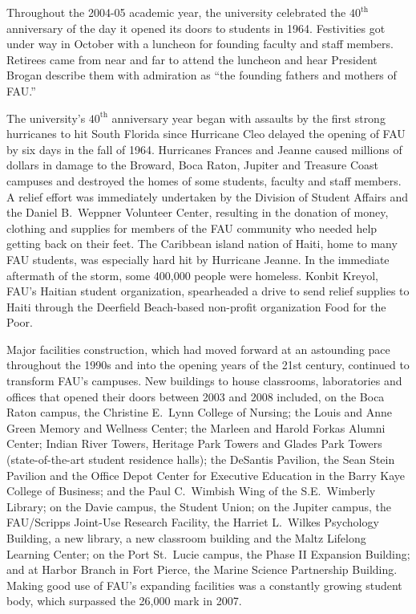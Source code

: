 \documentclass{article}
\begin{document}
Throughout the 2004-05 academic year, the university celebrated the $40^{\mathrm{th}}$ anniversary of the day it opened its doors to students in 1964.  Festivities got under way in October with a luncheon for founding faculty and staff members.  Retirees came from near and far to attend the luncheon and hear President Brogan describe them with admiration as ``the founding fathers and mothers of FAU.''

The university's $40^{\mathrm{th}}$ anniversary year began with assaults by the first strong hurricanes to hit South Florida since Hurricane Cleo delayed the opening of FAU by six days in the fall of 1964.  Hurricanes Frances and Jeanne caused millions of dollars in damage to the Broward, Boca Raton, Jupiter and Treasure Coast campuses and destroyed the homes of some students, faculty and staff members.  A relief effort was immediately undertaken by the Division of Student Affairs and the Daniel B.\ Weppner Volunteer Center, resulting in the donation of money, clothing and supplies for members of the FAU community who needed help getting back on their feet.  The Caribbean island nation of Haiti, home to many FAU students, was especially hard hit by Hurricane Jeanne.  In the immediate aftermath of the storm, some 400,000 people were homeless.  Konbit Kreyol, FAU's Haitian student organization, spearheaded a drive to send relief supplies to Haiti through the Deerfield Beach-based non-profit organization Food for the Poor.

Major facilities construction, which had moved forward at an astounding pace throughout the 1990s and into the opening years of the 21st century, continued to transform FAU's campuses.  New buildings to house classrooms, laboratories and offices that opened their doors between 2003 and 2008 included, on the Boca Raton campus, the Christine E.\ Lynn College of Nursing; the Louis and Anne Green Memory and Wellness Center; the Marleen and Harold Forkas Alumni Center; Indian River Towers, Heritage Park Towers and Glades Park Towers (state-of-the-art student residence halls); the DeSantis Pavilion, the Sean Stein Pavilion and the Office Depot Center for Executive Education in the Barry Kaye College of Business; and the Paul C.\ Wimbish Wing of the S.E.\ Wimberly Library; on the Davie campus, the Student Union; on the Jupiter campus, the FAU/Scripps Joint-Use Research Facility, the Harriet L.\ Wilkes Psychology Building, a new library, a new classroom building and the Maltz Lifelong Learning Center; on the Port St.\ Lucie campus, the Phase II Expansion Building; and at Harbor Branch in Fort Pierce, the Marine Science Partnership Building.  Making good use of FAU's expanding facilities was a constantly growing student body, which surpassed the 26,000 mark in 2007.
\end{document}
